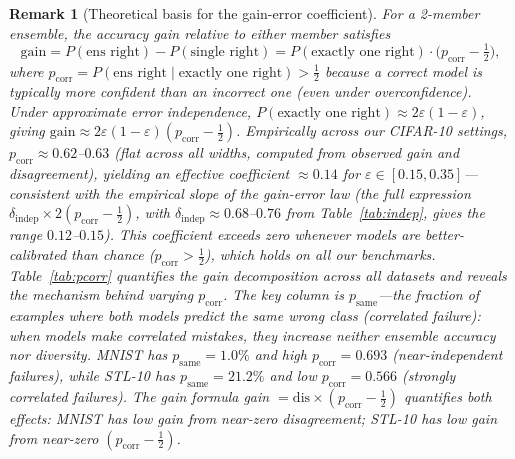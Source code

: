 \documentclass[11pt]{article}
\newtheorem{remark}{Remark}
\begin{document}
\begin{remark}[Theoretical basis for the gain-error coefficient]
\label{rem:coefficient}
For a 2-member ensemble, the accuracy gain relative to either member satisfies
\begin{equation*}
  \mathrm{gain}
  = P(\text{ens right}) - P(\text{single right})
  = P(\text{exactly one right}) \cdot \bigl(p_{\mathrm{corr}} - \tfrac{1}{2}\bigr),
\end{equation*}
where $p_{\mathrm{corr}} = P(\text{ens right} \mid \text{exactly one right}) > \tfrac{1}{2}$
because a correct model is typically more confident than an incorrect one
(even under overconfidence).  Under approximate error independence,
$P(\text{exactly one right}) \approx 2\varepsilon(1-\varepsilon)$, giving
$\mathrm{gain} \approx 2\varepsilon(1-\varepsilon)(p_{\mathrm{corr}} - \tfrac{1}{2})$.
Empirically across our CIFAR-10 settings, $p_{\mathrm{corr}} \approx 0.62$--$0.63$
(flat across all widths, computed from observed gain and disagreement), yielding an
effective coefficient $\approx 0.14$ for $\varepsilon \in [0.15,0.35]$---consistent with the empirical slope of the gain-error law (the full expression
$\delta_{\mathrm{indep}} \times 2(p_{\mathrm{corr}} - \tfrac{1}{2})$, with
$\delta_{\mathrm{indep}} \approx 0.68$--$0.76$ from Table~\ref{tab:indep}, gives the
range $0.12$--$0.15$).
This coefficient exceeds zero whenever models are better-calibrated than chance ($p_{\mathrm{corr}} > \tfrac{1}{2}$), which holds on all our benchmarks.
Table~\ref{tab:pcorr} quantifies the gain decomposition across all datasets and reveals the mechanism behind varying $p_{\mathrm{corr}}$.  The key column is $p_{\mathrm{same}}$---the fraction of examples where both models predict the \emph{same} wrong class (correlated failure): when models make correlated mistakes, they increase neither ensemble accuracy nor diversity.  MNIST has $p_{\mathrm{same}} = 1.0\%$ and high $p_{\mathrm{corr}} = 0.693$ (near-independent failures), while STL-10 has $p_{\mathrm{same}} = 21.2\%$ and low $p_{\mathrm{corr}} = 0.566$ (strongly correlated failures).  The gain formula gain $= \mathrm{dis} \times (p_{\mathrm{corr}} - \tfrac{1}{2})$ quantifies both effects: MNIST has low gain from near-zero disagreement; STL-10 has low gain from near-zero $(p_{\mathrm{corr}} - \tfrac{1}{2})$.
\end{remark}
\end{document}
